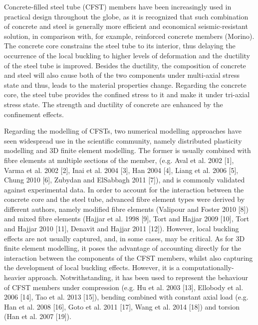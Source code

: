 Concrete-filled steel tube (CFST) members have been increasingly used in practical design throughout the globe, as it is recognized that such combination of concrete and steel is generally more efficient and economical seismic-resistant solution, in comparison with, for example, reinforced concrete members (Morino). The concrete core constrains the steel tube to its interior, thus delaying the occurrence of the local buckling to higher levels of deformation and the ductility of the steel tube is improved. Besides the ductility, the composition of concrete and steel will also cause both of the two components under multi-axial stress state and thus, leads to the material properties change. Regarding the concrete core, the steel tube provides the confined stress to it and make it under tri-axial stress state. The strength and ductility of concrete are enhanced by the confinement effects.

Regarding the modelling of CFSTs, two numerical modelling approaches have seen widespread use in the scientific community, namely distributed plasticity modelling and 3D finite element modelling. The former is usually combined with fibre elements at multiple sections of the member, (e.g. Aval et al. 2002 [1], Varma et al. 2002 [2], Inai et al. 2004 [3], Han 2004 [4], Liang et al. 2006 [5], Chung 2010 [6], Zubydan and ElSabbagh 2011 [7]), and is commonly validated against experimental data. In order to account for the interaction between the concrete core and the steel tube, advanced fibre element types were derived by different authors, namely modified fibre elements (Valipour and Foster 2010 [8]) and mixed fibre elements (Hajjar et al. 1998 [9], Tort and Hajjar 2009 [10], Tort and Hajjar 2010 [11], Denavit and Hajjar 2011 [12]). However, local buckling effects are not usually captured, and, in some cases, may be critical. As for 3D finite element modelling, it poses the advantage of accounting directly for the interaction between the components of the CFST members, whilst also capturing the development of local buckling effects. However, it is a computationally-heavier approach. Notwithstanding, it has been used to represent the behaviour of CFST members under compression (e.g. Hu et al. 2003 [13], Ellobody et al. 2006 [14], Tao et al. 2013 [15]), bending combined with constant axial load (e.g. Han et al. 2008 [16], Goto et al. 2011 [17], Wang et al. 2014 [18]) and torsion (Han et al. 2007 [19]).

